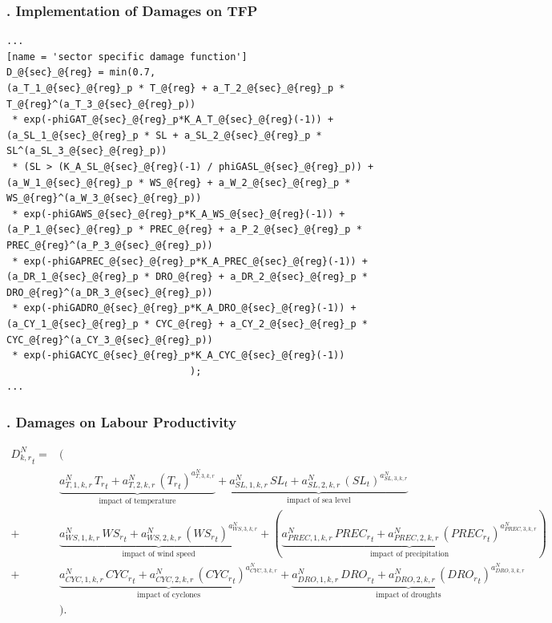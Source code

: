 \documentclass[11pt,aspectratio=169]{beamer}
\begin{document}
\begin{frame}[fragile]
\frametitle{{\thesection.\thesubsection} Implementation of Damages on TFP}

\begin{lstlisting}[frame = single]
...
[name = 'sector specific damage function']
D_@{sec}_@{reg} = min(0.7,
(a_T_1_@{sec}_@{reg}_p * T_@{reg} + a_T_2_@{sec}_@{reg}_p * T_@{reg}^(a_T_3_@{sec}_@{reg}_p))
 * exp(-phiGAT_@{sec}_@{reg}_p*K_A_T_@{sec}_@{reg}(-1)) + 
(a_SL_1_@{sec}_@{reg}_p * SL + a_SL_2_@{sec}_@{reg}_p * SL^(a_SL_3_@{sec}_@{reg}_p))
 * (SL > (K_A_SL_@{sec}_@{reg}(-1) / phiGASL_@{sec}_@{reg}_p)) + 
(a_W_1_@{sec}_@{reg}_p * WS_@{reg} + a_W_2_@{sec}_@{reg}_p * WS_@{reg}^(a_W_3_@{sec}_@{reg}_p))
 * exp(-phiGAWS_@{sec}_@{reg}_p*K_A_WS_@{sec}_@{reg}(-1)) + 
(a_P_1_@{sec}_@{reg}_p * PREC_@{reg} + a_P_2_@{sec}_@{reg}_p * PREC_@{reg}^(a_P_3_@{sec}_@{reg}_p))
 * exp(-phiGAPREC_@{sec}_@{reg}_p*K_A_PREC_@{sec}_@{reg}(-1)) +
(a_DR_1_@{sec}_@{reg}_p * DRO_@{reg} + a_DR_2_@{sec}_@{reg}_p * DRO_@{reg}^(a_DR_3_@{sec}_@{reg}_p))
 * exp(-phiGADRO_@{sec}_@{reg}_p*K_A_DRO_@{sec}_@{reg}(-1)) +
(a_CY_1_@{sec}_@{reg}_p * CYC_@{reg} + a_CY_2_@{sec}_@{reg}_p * CYC_@{reg}^(a_CY_3_@{sec}_@{reg}_p))
 * exp(-phiGACYC_@{sec}_@{reg}_p*K_A_CYC_@{sec}_@{reg}(-1))
								);
...
\end{lstlisting}
\end{frame}

\begin{frame}
\frametitle{{\thesection.\thesubsection} Damages on Labour Productivity}
\scriptsize
\begin{align*}
{{D^{N}_{k,r}}_{t}}=& \Big( \nonumber \\
&\underbrace{{{a^{N}_{T,1,k,r}}} \, {{T_{r}}_{t}}+{{a^{N}_{T,2,k,r}}}\, \left({T_{r}}_{t}\right)^{a^{N}_{T,3,k,r}}}_{\mbox{impact of temperature}} + 
\underbrace{{{a^{N}_{SL,1,k,r}}}\, {{SL}_{t}}+{{a^{N}_{SL,2,k,r}}}\, \left({SL}_{t}\right)^{{{a^{N}_{SL,3,k,r}}}}}_{\mbox{impact of sea level}} \nonumber \\
+ & \underbrace{{{a^{N}_{WS,1,k,r}}}\, {{WS_{r}}_{t}}+{{a^{N}_{WS,2,k,r}}}\, \left({WS_{r}}_{t}\right)^{{{a^{N}_{WS,3,k,r}}}}}_{\mbox{impact of wind speed}} 
+ (\underbrace{{{a^{N}_{PREC,1,k,r}}} \, {{PREC_{r}}_{t}}+{{a^{N}_{PREC,2,k,r}}}\, \left({PREC_{r}}_{t}\right)^{{{a^{N}_{PREC,3,k,r}}}}}_{\mbox{impact of precipitation}}) \,  \nonumber \\
+ & \underbrace{{{a^{N}_{CYC,1,k,r}}}\, {{CYC_{r}}_{t}}+{{a^{N}_{CYC,2,k,r}}}\, \left({CYC_{r}}_{t}\right)^{{{a^{N}_{CYC,3,k,r}}}}}_{\mbox{impact of cyclones}}
+ \underbrace{{{a^{N}_{DRO,1,k,r}}} \, {{DRO_{r}}_{t}}+{{a^{N}_{DRO,2,k,r}}}\, \left({DRO_{r}}_{t}\right)^{{{a^{N}_{DRO,3,k,r}}}}}_{\mbox{impact of droughts}} \nonumber \\
&\Big).
\end{align*}
\end{frame}
\end{document}

